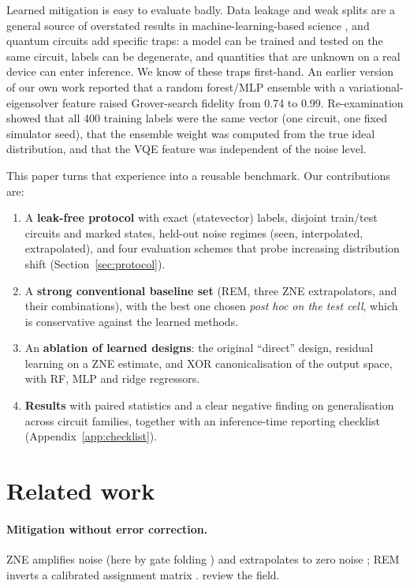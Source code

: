 \documentclass[11pt]{article}
\begin{document}
Learned mitigation is easy to evaluate badly. Data leakage and weak splits are a general source of overstated results in machine-learning-based science \citep{kapoor2023}, and quantum circuits add specific traps: a model can be trained and tested on the same circuit, labels can be degenerate, and quantities that are unknown on a real device can enter inference. We know of these traps first-hand. An earlier version of our own work reported that a random forest/MLP ensemble with a variational-eigensolver feature raised Grover-search fidelity from 0.74 to 0.99. Re-examination showed that all 400 training labels were the same vector (one circuit, one fixed simulator seed), that the ensemble weight was computed from the true ideal distribution, and that the VQE feature was independent of the noise level.

This paper turns that experience into a reusable benchmark. Our contributions are:
\begin{enumerate}
\item A \textbf{leak-free protocol} with exact (statevector) labels, disjoint train/test circuits and marked states, held-out noise regimes (seen, interpolated, extrapolated), and four evaluation schemes that probe increasing distribution shift (Section~\ref{sec:protocol}).
\item A \textbf{strong conventional baseline set} (REM, three ZNE extrapolators, and their combinations), with the best one chosen \emph{post hoc on the test cell}, which is conservative against the learned methods.
\item An \textbf{ablation of learned designs}: the original ``direct'' design, residual learning on a ZNE estimate, and XOR canonicalisation of the output space, with RF, MLP and ridge regressors.
\item \textbf{Results} with paired statistics and a clear negative finding on generalisation across circuit families, together with an inference-time reporting checklist (Appendix~\ref{app:checklist}).
\end{enumerate}

\section{Related work}
\paragraph{Mitigation without error correction.} ZNE amplifies noise (here by gate folding \citep{giurgicatiron2020}) and extrapolates to zero noise \citep{temme2017,li2017,kandala2019}; REM inverts a calibrated assignment matrix \citep{bravyi2021}. \citet{cai2023} review the field.
\end{document}
